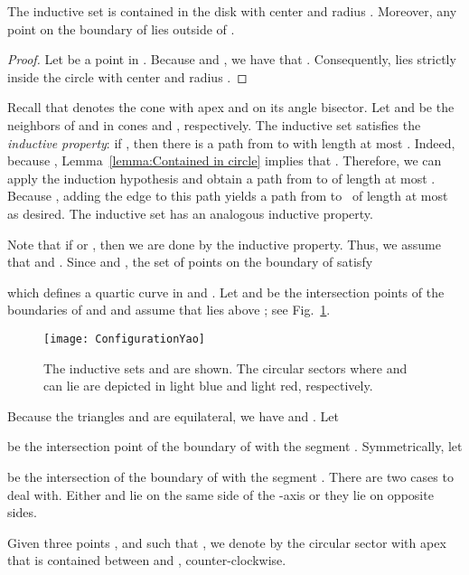 \documentclass{cccg14}
\begin{document}
\begin{lemma}\label{lemma:Contained in circle}
The inductive set  is contained in the disk  with center  and radius .
Moreover, any point  on the boundary of  lies outside of .
\end{lemma}
\vspace{-0.8em}
\begin{proof}
Let  be a point in .
Because  and , we have that 
.
Consequently,
 lies strictly inside the circle with center  and radius .
\end{proof}

\vspace{-0.5em}
Recall that  denotes the cone with apex  and  on its angle bisector.
Let  and  be the neighbors of  and  in cones  and , respectively.
The inductive set  satisfies the \emph{inductive property}:
if ,
then there is a path from  to  with length at most .
Indeed,
because , Lemma~\ref{lemma:Contained in circle} implies that .
Therefore,
we can apply the induction hypothesis and obtain a path from  to  of length at most . 
Because , adding the edge  to this path yields a path from  to~ 
of length at most  as desired.
The inductive set  has an analogous inductive property.

Note that if 
or ,
then we are done by the inductive property.
Thus, we assume that  and .
Since  and ,
the set of points on the boundary of  satisfy

which defines a quartic curve in  and . 
Let  and  be the intersection points of the boundaries of  and  and assume that  lies above ;
see Fig.~\ref{fig:Configuration}.
\begin{figure}[t]
\centering
\texttt{[image: ConfigurationYao]}
\caption{\small The inductive sets  and  are shown. The circular sectors where  and  can lie are depicted in light blue and light red, respectively.}
\label{fig:Configuration}
\end{figure}
Because the triangles  and  are equilateral,
we have  and .
Let

be the intersection point of the boundary of  with the segment . 
Symmetrically,
let

be the intersection of the boundary of  with the segment .
There are two cases to deal with. Either   and  lie on the same side of the -axis
or  they lie on opposite sides.

Given three points ,  and  such that ,
we denote by  the circular sector with apex  that is contained between  and ,
counter-clockwise.\vspace{.05in}
\end{document}
